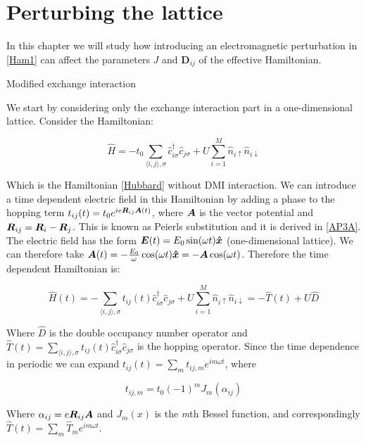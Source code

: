 \chapter{Perturbing the lattice}

In this chapter we will study how introducing an electromagnetic perturbation in \ref{Ham1} can affect the parameters $J$ and $\boldsymbol{D}_{ij}$ of the effective Hamiltonian. 

\begin{section}{Modified exchange interaction}

We start by considering only the exchange interaction part in a one-dimensional lattice. Consider the Hamiltonian:

\begin{equation}
\hat{H} = -t_0\sum_{\langle i,j \rangle, \sigma} \hat{c}_{i \sigma}^\dagger \hat{c}_{j \sigma} + U \sum_{i=1}^M \hat{n}_{i\uparrow}\hat{n}_{i\downarrow}
\end{equation}

Which is the Hamiltonian \ref{Hubbard} without DMI interaction. We can introduce a time dependent electric field in this Hamiltonian by adding a phase to the hopping term $t_{ij}(t) = t_0e^{ie\boldsymbol{R}_{ij}\boldsymbol{A}(t)}$, where $\boldsymbol{A}$ is the vector potential and $\boldsymbol{R}_{ij} = \boldsymbol{R}_i-\boldsymbol{R}_j$. This is known as Peierls substitution and it is derived in \ref{AP3A}. The electric field has the form $\boldsymbol{E}(t) = E_0 \sin (\omega t)\boldsymbol{\hat{x}}$ (one-dimensional lattice). We can therefore take $\boldsymbol{A}(t) = -\frac{E_0}{\omega}\cos(\omega t)\boldsymbol{\hat{x}} = -\boldsymbol{A}\cos(\omega t)$. Therefore the time dependent Hamiltonian is:

\begin{equation}
\hat{H}(t) = -\sum_{\langle i,j \rangle, \sigma} t_{ij}(t)\hat{c}_{i \sigma}^\dagger \hat{c}_{j \sigma} + U \sum_{i=1}^M \hat{n}_{i\uparrow}\hat{n}_{i\downarrow} = -\hat{T}(t) + U\hat{D}
\end{equation}

Where $\hat{D}$ is the double occupancy number operator and $\hat{T}(t) = \sum_{\langle i,j \rangle, \sigma} t_{ij}(t)\hat{c}_{i \sigma}^\dagger \hat{c}_{j \sigma}$ is the hopping operator. Since the time dependence in periodic we can expand $t_{ij}(t) = \sum_m t_{ij,m} e^{im \omega t}$, where

\begin{equation}
t_{ij,m} = t_0(-1)^mJ_m(\alpha_{ij})
\end{equation}

Where $\alpha_{ij} = e\boldsymbol{R}_{ij}\boldsymbol{A}$ and $J_m(x)$ is the \textit{m}th Bessel function, and correspondingly $\hat{T}(t) = \sum_m \hat{T}_m e^{im \omega t}$.


\end{section}
